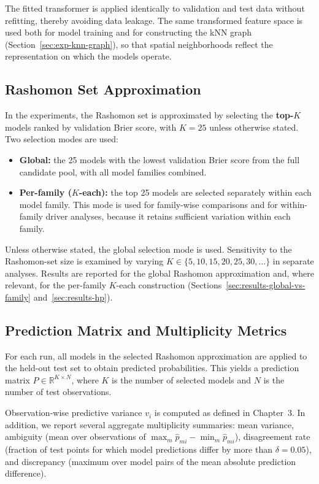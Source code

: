 The fitted transformer is applied identically to validation and test data without refitting,
thereby avoiding data leakage. The same transformed feature space is used both for model
training and for constructing the kNN graph (Section~\ref{sec:exp-knn-graph}), so that
spatial neighborhoods reflect the representation on which the models operate.
\subsection{Rashomon Set Approximation}
\label{sec:exp-rashomon}

In the experiments, the Rashomon set is approximated by selecting the \textbf{top-$K$}
models ranked by validation Brier score, with $K = 25$ unless otherwise stated. Two
selection modes are used:

\begin{itemize}
    \item \textbf{Global:} the 25 models with the lowest validation Brier score from the full candidate pool, with all model families combined.
    \item \textbf{Per-family ($K$-each):} the top 25 models are selected separately within each model family. This mode is used for family-wise comparisons and for within-family driver analyses, because it retains sufficient variation within each family.
\end{itemize}

Unless otherwise stated, the global selection mode is used. Sensitivity to the Rashomon-set
size is examined by varying $K \in \{5, 10, 15, 20, 25, 30, \ldots\}$ in separate analyses.
Results are reported for the global Rashomon approximation and, where relevant, for the
per-family $K$-each construction (Sections~\ref{sec:results-global-vs-family}
and~\ref{sec:results-hp}).

\subsection{Prediction Matrix and Multiplicity Metrics}

For each run, all models in the selected Rashomon approximation are applied to the held-out
test set to obtain predicted probabilities. This yields a prediction matrix
$P \in \mathbb{R}^{K \times N}$, where $K$ is the number of selected models and $N$ is
the number of test observations.

Observation-wise predictive variance $v_i$ is computed as defined in Chapter~3. In
addition, we report several aggregate multiplicity summaries: mean variance, ambiguity
(mean over observations of $\max_m \hat{p}_{mi} - \min_m \hat{p}_{mi}$), disagreement
rate (fraction of test points for which model predictions differ by more than
$\delta = 0.05$), and discrepancy (maximum over model pairs of the mean absolute
prediction difference).

